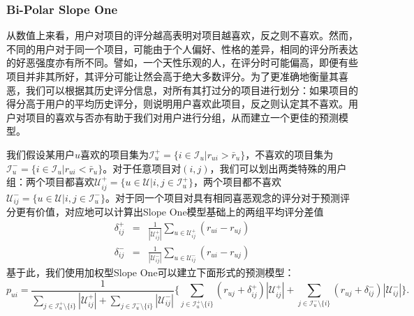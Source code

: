 \subsubsection{Bi-Polar Slope One}
从数值上来看，用户对项目的评分越高表明对项目越喜欢，反之则不喜欢。然而，不同的用户对于同一个项目，可能由于个人偏好、性格的差异，相同的评分所表达的好恶强度亦有所不同。譬如，一个天性乐观的人，在评分时可能偏高，即便有些项目并非其所好，其评分可能让然会高于绝大多数评分。为了更准确地衡量其喜恶，我们可以根据其历史评分信息，对所有其打过分的项目进行划分：如果项目的得分高于用户的平均历史评分，则说明用户喜欢此项目，反之则认定其不喜欢。用户对项目的喜欢与否亦有助于我们对用户进行分组，从而建立一个更佳的预测模型。

我们假设某用户$u$喜欢的项目集为$\mathcal I_u^{+}=\{i\in\mathcal I_u|r_{ui}>\bar r_u\}$，不喜欢的项目集为$\mathcal I_u^{-}=\{i\in\mathcal I_u|r_{ui}<\bar r_u\}$。对于任意项目对$(i,j)$，我们可以划出两类特殊的用户组：两个项目都喜欢$\mathcal U_{ij}^{+}=\{u\in \mathcal U|i, j\in \mathcal I_u^{+}\}$，两个项目都不喜欢$\mathcal U_{ij}^{-}=\{u\in \mathcal U|i, j\in \mathcal I_u^{-}\}$。对于同一个项目对具有相同喜恶观念的评分对于预测评分更有价值，对应地可以计算出Slope One模型基础上的两组平均评分差值
\begin{eqnarray}
  \delta_{ij}^{+} &=& \frac{1}{|\mathcal U_{ij}^{+}|}\sum\limits_{u\in \mathcal U_{ij}^{+}} (r_{ui} - r_{uj})\\
  \delta_{ij}^{-} &=& \frac{1}{|\mathcal U_{ij}^{-}|}\sum\limits_{u\in \mathcal U_{ij}^{-}} (r_{ui} - r_{uj})
\end{eqnarray}
基于此，我们使用加权型Slope One可以建立下面形式的预测模型：
\begin{equation}\label{eq:bipolarslopeone}
    p_{ui} = \frac{1}{\sum\limits_{j\in \mathcal I_u^{+}\setminus \{i\}} |\mathcal U_{ij}^{+}|+\sum\limits_{j\in \mathcal I_u^{-}\setminus \{i\}} |\mathcal U_{ij}^{-}|} \bigg\{\sum\limits_{j\in \mathcal I_u^{+}\setminus \{i\}} (r_{uj} + \delta_{ij}^{+})|\mathcal U_{ij}^{+}| + \sum\limits_{j\in \mathcal I_u^{-}\setminus \{i\}} (r_{uj} + \delta_{ij}^{-})|\mathcal U_{ij}^{-}| \bigg\}.
\end{equation}

